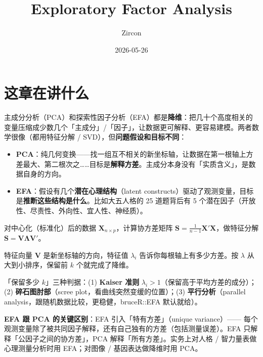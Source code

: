 \documentclass[
]{ctexart}
\title{Exploratory Factor Analysis}
\author{Zircon}
\date{2026-05-26}
\providecommand{\tightlist}{%
  \setlength{\itemsep}{0pt}\setlength{\parskip}{0pt}}
\begin{document}
\maketitle

{
\setcounter{tocdepth}{2}
\tableofcontents
}
\hypertarget{ux8fd9ux7ae0ux5728ux8bb2ux4ec0ux4e48}{%
\section{这章在讲什么}\label{ux8fd9ux7ae0ux5728ux8bb2ux4ec0ux4e48}}

主成分分析（PCA）和探索性因子分析（EFA）都是\textbf{降维}：把几十个高度相关的变量压缩成少数几个「主成分」/「因子」，让数据更可解释、更容易建模。两者数学很像（都用特征分解
/ SVD），但\textbf{问题假设和目标不同}：

\begin{itemize}
\tightlist
\item
  \textbf{PCA}：纯几何变换------找一组互不相关的新坐标轴，让数据在第一根轴上方差最大、第二根次之\ldots\ldots 目标是\textbf{解释方差}。主成分本身没有「实质含义」，是数据自身的方向。
\item
  \textbf{EFA}：假设有几个\textbf{潜在心理结构}（latent
  constructs）驱动了观测变量，目标是\textbf{推断这些结构是什么}。比如大五人格的
  25 道题背后有 5 个潜在因子（开放性、尽责性、外向性、宜人性、神经质）。
\end{itemize}

\begin{concept}
对中心化（标准化）后的数据 $\mathbf{X}_{n \times p}$，计算协方差矩阵 $\mathbf{S} = \frac{1}{n-1}\mathbf{X}'\mathbf{X}$，做特征分解 $\mathbf{S} = \mathbf{V}\mathbf{\Lambda}\mathbf{V}'$。

特征向量 $\mathbf{V}$ 是新坐标轴的方向，特征值 $\lambda_i$ 告诉你每根轴上有多少方差。按 $\lambda$ 从大到小排序，保留前 $k$ 个就完成了降维。

「保留多少 $k$」三种判据：(1) \textbf{Kaiser 准则} $\lambda_i > 1$（保留高于平均方差的成分）；(2) \textbf{碎石图肘部}（scree plot，看曲线突然变缓的位置）；(3) \textbf{平行分析}（parallel analysis，跟随机数据比较，更稳健，bruceR::EFA 默认就给）。
\end{concept}

\textbf{EFA 跟 PCA 的关键区别}：EFA 引入「特有方差」（unique
variance）------
每个观测变量除了被共同因子解释，还有自己独有的方差（包括测量误差）。EFA
只解释「公因子之间的协方差」，PCA 解释「所有方差」。实务上对人格 /
智力量表做心理测量分析时用 EFA；对图像 / 基因表达做降维时用 PCA。
\end{document}
